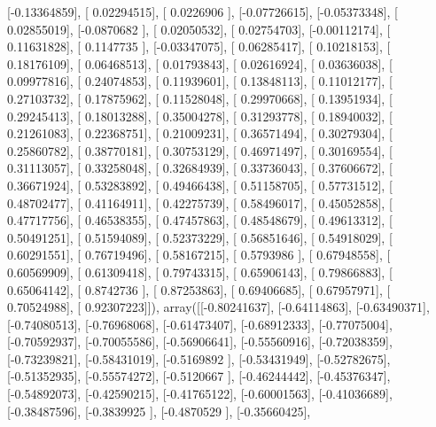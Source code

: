\documentclass{article}
\begin{document}
       [-0.13364859],
       [ 0.02294515],
       [ 0.0226906 ],
       [-0.07726615],
       [-0.05373348],
       [ 0.02855019],
       [-0.0870682 ],
       [ 0.02050532],
       [ 0.02754703],
       [-0.00112174],
       [ 0.11631828],
       [ 0.1147735 ],
       [-0.03347075],
       [ 0.06285417],
       [ 0.10218153],
       [ 0.18176109],
       [ 0.06468513],
       [ 0.01793843],
       [ 0.02616924],
       [ 0.03636038],
       [ 0.09977816],
       [ 0.24074853],
       [ 0.11939601],
       [ 0.13848113],
       [ 0.11012177],
       [ 0.27103732],
       [ 0.17875962],
       [ 0.11528048],
       [ 0.29970668],
       [ 0.13951934],
       [ 0.29245413],
       [ 0.18013288],
       [ 0.35004278],
       [ 0.31293778],
       [ 0.18940032],
       [ 0.21261083],
       [ 0.22368751],
       [ 0.21009231],
       [ 0.36571494],
       [ 0.30279304],
       [ 0.25860782],
       [ 0.38770181],
       [ 0.30753129],
       [ 0.46971497],
       [ 0.30169554],
       [ 0.31113057],
       [ 0.33258048],
       [ 0.32684939],
       [ 0.33736043],
       [ 0.37606672],
       [ 0.36671924],
       [ 0.53283892],
       [ 0.49466438],
       [ 0.51158705],
       [ 0.57731512],
       [ 0.48702477],
       [ 0.41164911],
       [ 0.42275739],
       [ 0.58496017],
       [ 0.45052858],
       [ 0.47717756],
       [ 0.46538355],
       [ 0.47457863],
       [ 0.48548679],
       [ 0.49613312],
       [ 0.50491251],
       [ 0.51594089],
       [ 0.52373229],
       [ 0.56851646],
       [ 0.54918029],
       [ 0.60291551],
       [ 0.76719496],
       [ 0.58167215],
       [ 0.5793986 ],
       [ 0.67948558],
       [ 0.60569909],
       [ 0.61309418],
       [ 0.79743315],
       [ 0.65906143],
       [ 0.79866883],
       [ 0.65064142],
       [ 0.8742736 ],
       [ 0.87253863],
       [ 0.69406685],
       [ 0.67957971],
       [ 0.70524988],
       [ 0.92307223]]), array([[-0.80241637],
       [-0.64114863],
       [-0.63490371],
       [-0.74080513],
       [-0.76968068],
       [-0.61473407],
       [-0.68912333],
       [-0.77075004],
       [-0.70592937],
       [-0.70055586],
       [-0.56906641],
       [-0.55560916],
       [-0.72038359],
       [-0.73239821],
       [-0.58431019],
       [-0.5169892 ],
       [-0.53431949],
       [-0.52782675],
       [-0.51352935],
       [-0.55574272],
       [-0.5120667 ],
       [-0.46244442],
       [-0.45376347],
       [-0.54892073],
       [-0.42590215],
       [-0.41765122],
       [-0.60001563],
       [-0.41036689],
       [-0.38487596],
       [-0.3839925 ],
       [-0.4870529 ],
       [-0.35660425],
\end{document}

